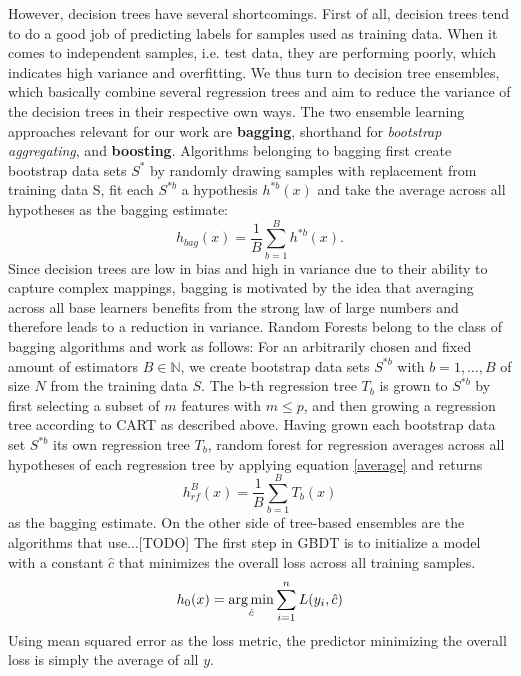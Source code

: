 However, decision trees have several shortcomings. First of all, decision trees tend to do a good job of predicting labels for samples used as training data. When it comes to independent samples, i.e. test data, they are performing poorly, which indicates high variance and overfitting. We thus turn to  decision tree ensembles, which basically combine several regression trees and aim to reduce the variance of the decision trees in their respective own ways. 
The two ensemble learning approaches relevant for our work are \textbf{bagging}, shorthand for \textit{bootstrap aggregating}, and \textbf{boosting}. 
Algorithms belonging to bagging first create bootstrap data sets $ S^{*} $ by randomly drawing samples with replacement from training data S, fit each $ S^{*b} $ a hypothesis $ h^{*b}(x) $ and take the average across all hypotheses as the bagging estimate: 
\begin{equation}\label{average}
	h_{bag}(x) = \dfrac{1}{B} \sum_{b=1}^{B} h^{*b}(x).
\end{equation}
Since decision trees are low in bias and high in variance due to their ability to capture complex mappings, bagging is motivated by the idea that averaging across all base learners benefits from the strong law of large numbers and therefore leads to a reduction in variance. 
Random Forests belong to the class of bagging algorithms and work as follows:
For an arbitrarily chosen and fixed amount of estimators $ B \in \mathbb{N}$, we create bootstrap data sets $ S^{*b} $ with $ b = 1, \dots, B $ of size $ N $ from the training data $ S $. The b-th regression tree $ T_b $ is grown to $ S^{*b} $ by first selecting a subset of $ m $ features with $ m \leq p $, and then growing a regression tree according to CART as described above.
Having grown each bootstrap data set $ S^{*b} $ its own regression tree $ T_b $, random forest for regression averages across all hypotheses of each regression tree by applying equation \ref{average} and returns
\begin{equation}
h^{B}_{rf}(x) = \dfrac{1}{B} \sum_{b=1}^{B} T_b(x)
\end{equation}
as the bagging estimate.
On the other side of tree-based ensembles are the algorithms that use...[TODO]
The first step in GBDT is to initialize a model with a constant $ \hat{c} $ that minimizes the overall loss across all training samples.
\begin{equation}
h_{0}(x) =  \operatorname*{arg\,min}_{\hat{c}} \sum_{i=1}^n L(y_i,\hat{c}) \label{gbdt_step1}
\end{equation}
Using mean squared error as the loss metric, the predictor minimizing the overall loss is simply the average of all $ y $.
